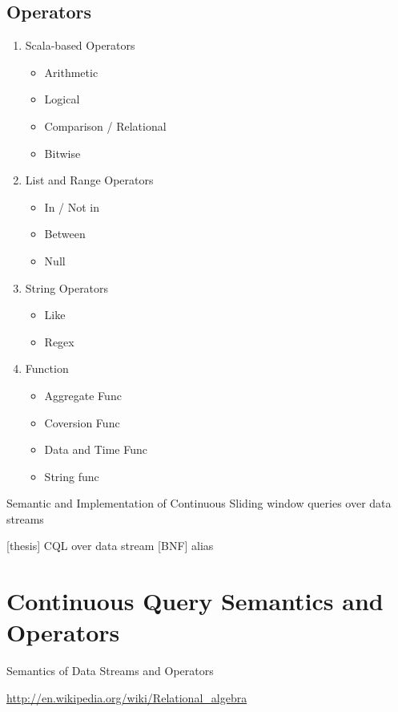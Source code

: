 \subsection{Operators}
\begin{enumerate}

\item Scala-based Operators
	\begin{itemize}
        \item Arithmetic
        \item Logical
        \item Comparison / Relational
        \item Bitwise
	\end{itemize}
	
 \item List and Range Operators
 	\begin{itemize}
        \item In / Not in
        \item Between
        \item Null
 	\end{itemize}
 \item String Operators
 	\begin{itemize}
        \item Like
        \item Regex
 	\end{itemize}
 \item Function 
 	\begin{itemize}
        \item Aggregate Func
        \item Coversion Func
       	\item Data and Time Func
        \item String func
 	\end{itemize}

\end{enumerate}
Semantic and Implementation of Continuous Sliding window queries over data streams

[thesis] CQL over data stream [BNF] alias



\section{Continuous Query Semantics and Operators} \label{semantic}
Semantics of Data Streams and Operators

\href{http://en.wikipedia.org/wiki/Relational\_algebra}{http://en.wikipedia.org/wiki/Relational\_algebra}
